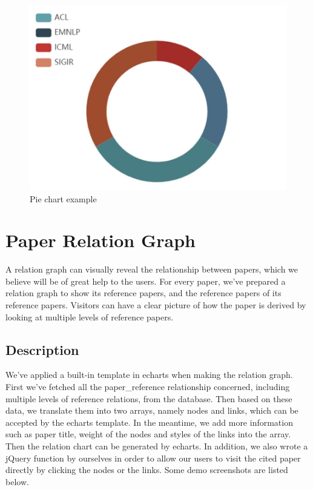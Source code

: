 \documentclass{book}
\begin{document}
\begin{figure}[H]
\centering
\includegraphics[scale=0.6]{img/fsh_pie.jpg}
\caption{Pie chart example}
\end{figure}





\section {Paper Relation Graph}

A relation graph can visually reveal the relationship between papers, which we believe will be of great help to the users. For every paper, we've prepared a relation graph to show its reference papers, and the reference papers of its reference papers. Visitors can have a clear picture of how the paper is derived by looking at multiple levels of reference papers.

\subsection{Description}

We've applied a built-in template in echarts when making the relation graph. First we've fetched all the paper\_reference relationship concerned, including multiple levels of reference relations, from the database. Then based on these data, we translate them into two arrays, namely nodes and links, which can be accepted by the echarts template. In the meantime, we add more information such as paper title, weight of the nodes and styles of the links into the array. Then the relation chart can be generated by echarts. In addition, we also wrote a jQuery function by ourselves in order to allow our users to visit the cited paper directly by clicking the nodes or the links. Some demo screenshots are listed below.
\end{document}
